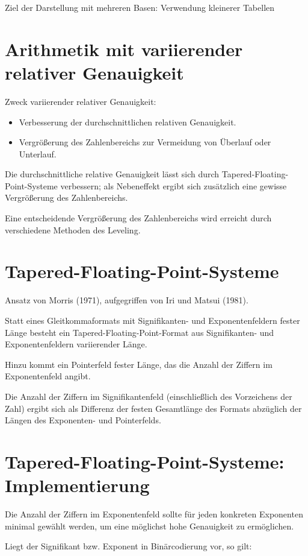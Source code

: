 \documentclass[10pt]{article}
\begin{document}
Ziel der Darstellung mit mehreren Basen: Verwendung kleinerer Tabellen

\section*{Arithmetik mit variierender relativer Genauigkeit}
Zweck variierender relativer Genauigkeit:

\begin{itemize}
  \item Verbesserung der durchschnittlichen relativen Genauigkeit.
  \item Vergrößerung des Zahlenbereichs zur Vermeidung von Überlauf oder Unterlauf.
\end{itemize}

Die durchschnittliche relative Genauigkeit lässt sich durch Tapered-Floating-Point-Systeme verbessern; als Nebeneffekt ergibt sich zusätzlich eine gewisse Vergrößerung des Zahlenbereichs.

Eine entscheidende Vergrößerung des Zahlenbereichs wird erreicht durch verschiedene Methoden des Leveling.

\section*{Tapered-Floating-Point-Systeme}
Ansatz von Morris (1971), aufgegriffen von Iri und Matsui (1981).

Statt eines Gleitkommaformats mit Signifikanten- und Exponentenfeldern fester Länge besteht ein Tapered-Floating-Point-Format aus Signifikanten- und Exponentenfeldern variierender Länge.

Hinzu kommt ein Pointerfeld fester Länge, das die Anzahl der Ziffern im Exponentenfeld angibt.

Die Anzahl der Ziffern im Signifikantenfeld (einschließlich des Vorzeichens der Zahl) ergibt sich als Differenz der festen Gesamtlänge des Formats abzüglich der Längen des Exponenten- und Pointerfelds.

\section*{Tapered-Floating-Point-Systeme: Implementierung}
Die Anzahl der Ziffern im Exponentenfeld sollte für jeden konkreten Exponenten minimal gewählt werden, um eine möglichst hohe Genauigkeit zu ermöglichen.

Liegt der Signifikant bzw. Exponent in Binärcodierung vor, so gilt:
\end{document}
